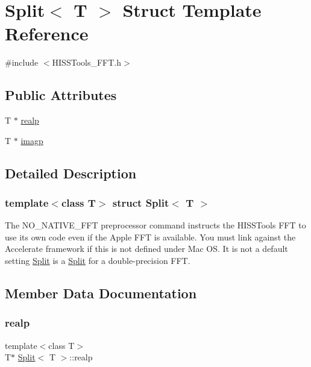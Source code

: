 \hypertarget{struct_split}{}\section{Split$<$ T $>$ Struct Template Reference}
\label{struct_split}


{\ttfamily \#include $<$H\+I\+S\+S\+Tools\+\_\+\+F\+F\+T.\+h$>$}

\subsection*{Public Attributes}
\begin{DoxyCompactItemize}
\item 
T $\ast$ \hyperlink{struct_split_aaadcedfa082d6f07b33cd89ea4f19814}{realp}
\item 
T $\ast$ \hyperlink{struct_split_a21ff23a96abee0c0ed6a2433798c4eac}{imagp}
\end{DoxyCompactItemize}


\subsection{Detailed Description}
\subsubsection*{template$<$class T$>$\newline
struct Split$<$ T $>$}

The N\+O\+\_\+\+N\+A\+T\+I\+V\+E\+\_\+\+F\+FT preprocessor command instructs the H\+I\+S\+S\+Tools F\+FT to use its own code even if the Apple F\+FT is available. You must link against the Accelerate framework if this is not defined under Mac OS. It is not a default setting \hyperlink{struct_split}{Split} is a \hyperlink{struct_split}{Split} for a double-\/precision F\+FT. 

\subsection{Member Data Documentation}
\mbox{\label{struct_split_aaadcedfa082d6f07b33cd89ea4f19814}} 
\subsubsection{\texorpdfstring{realp}{realp}}
{\footnotesize\ttfamily template$<$class T$>$ \\
T$\ast$ \hyperlink{struct_split}{Split}$<$ T $>$\+::realp}

